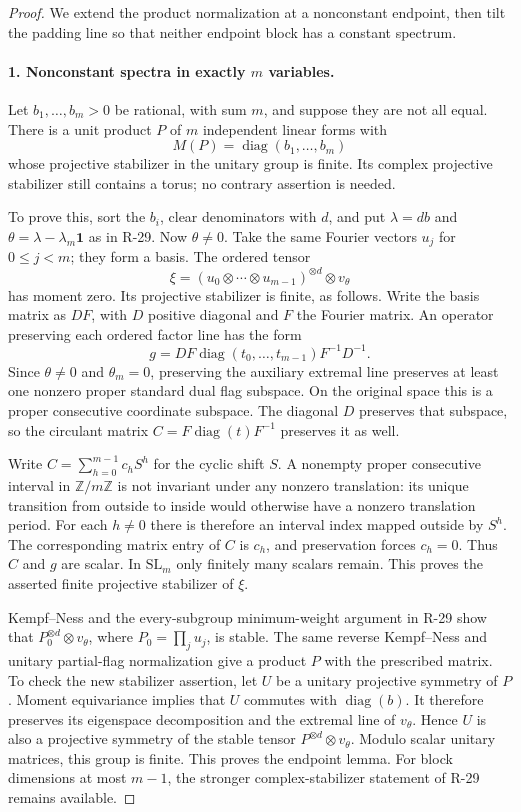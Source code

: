 \begin{proof}
We extend the product normalization at a nonconstant endpoint,
then tilt the padding line so that neither endpoint block has
a constant spectrum.

\paragraph{1. Nonconstant spectra in exactly $m$ variables.}
Let $b_1,\ldots,b_m>0$ be rational, with sum $m$, and suppose
they are not all equal. There is a unit product $P$ of $m$
independent linear forms with
\[
 M(P)=\operatorname{diag}(b_1,\ldots,b_m)
\]
whose projective stabilizer in the unitary group is finite.
Its complex projective stabilizer still contains a torus;
no contrary assertion is needed.

To prove this, sort the $b_i$, clear denominators with $d$,
and put $\lambda=db$ and $\theta=\lambda-\lambda_m\mathbf1$
as in R-29. Now $\theta\ne0$. Take the same Fourier vectors
$u_j$ for $0\leq j<m$; they form a basis. The ordered tensor
\[
 \xi=(u_0\otimes\cdots\otimes u_{m-1})^{\otimes d}
                                      \otimes v_\theta
\]
has moment zero. Its projective stabilizer is finite, as follows.
Write the basis matrix as $DF$, with $D$ positive diagonal and
$F$ the Fourier matrix. An operator preserving each ordered
factor line has the form
\[
 g=DF\operatorname{diag}(t_0,\ldots,t_{m-1})F^{-1}D^{-1}.
\]
Since $\theta\ne0$ and $\theta_m=0$, preserving the auxiliary
extremal line preserves at least one nonzero proper standard
dual flag subspace. On the original space this is a proper
consecutive coordinate subspace. The diagonal $D$ preserves
that subspace, so the circulant matrix
$C=F\operatorname{diag}(t)F^{-1}$ preserves it as well.

Write $C=\sum_{h=0}^{m-1}c_h S^h$ for the cyclic shift $S$.
A nonempty proper consecutive interval in $\mathbb Z/m\mathbb Z$
is not invariant under any nonzero translation: its unique
transition from outside to inside would otherwise have a
nonzero translation period. For each $h\ne0$ there is therefore
an interval index mapped outside by $S^h$. The corresponding
matrix entry of $C$ is $c_h$, and preservation forces $c_h=0$.
Thus $C$ and $g$ are scalar. In $\mathrm{SL}_m$ only finitely
many scalars remain. This proves the asserted finite projective
stabilizer of $\xi$.

Kempf--Ness and the every-subgroup minimum-weight argument in
R-29 show that $P_0^{\otimes d}\otimes v_\theta$, where
$P_0=\prod_j u_j$, is stable. The same reverse Kempf--Ness and
unitary partial-flag normalization give a product $P$ with the
prescribed matrix. To check the new stabilizer assertion, let
$U$ be a unitary projective symmetry of $P$. Moment equivariance
implies that $U$ commutes with $\operatorname{diag}(b)$.
It therefore preserves its eigenspace decomposition and the
extremal line of $v_\theta$. Hence $U$ is also a projective
symmetry of the stable tensor $P^{\otimes d}\otimes v_\theta$.
Modulo scalar unitary matrices, this group is finite.
This proves the endpoint lemma. For block dimensions at most
$m-1$, the stronger complex-stabilizer statement of R-29
remains available.


\end{proof}
